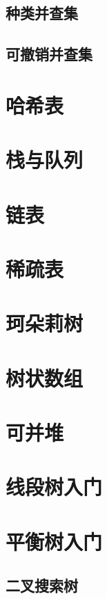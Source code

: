 \documentclass[12pt,a4paper]{article}
\begin{document}
\subsection{种类并查集}
\subsection{可撤销并查集}

\newpage
\section{哈希表}

\newpage
\section{栈与队列}

\newpage
\section{链表} %

\newpage
\section{稀疏表}

\newpage
\section{珂朵莉树}

\newpage
\section{树状数组}

\newpage
\section{可并堆}

\newpage
\section{线段树入门} %

\newpage
\section{平衡树入门}
\subsection{二叉搜索树}
\end{document}

